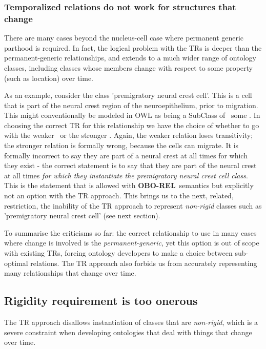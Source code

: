 \documentclass{bioinfo}
\def\partOf{\pr{part\_of}}
\def\atAllTimes{\pr{at-all-times}}
\def\atSomeTimes{\pr{at-some-times}}
\def\OBOREL{\textbf{OBO-REL}}
\begin{document}
\subsubsection{Temporalized relations do not work for structures that
  change}

There are many cases beyond the nucleus-cell case where permanent
generic parthood is required. In fact, the logical problem with the
TRs is deeper than the permanent-generic relationships, and extends to
a much wider range of ontology classes, including classes whose
members change with respect to some property (such as location) over
time.

As an example, consider the class 'premigratory neural crest
cell'. This is a cell that is part of the neural crest region of the
neuroepithelium, prior to migration. This might conventionally be
modeled in OWL as being a SubClass of \partOf\ some . In choosing the correct TR for this relationship we have the
choice of whether to go with the weaker \atSomeTimes\ or the stronger
\atAllTimes. Again, the weaker relation loses transitivity; the
stronger relation is formally wrong, because the cells can migrate. It
is formally incorrect to say they are part of a neural crest at all
times for which they exist - the correct statement is to say that they
are part of the neural crest at all times \emph{for which they
  instantiate the premigratory neural crest cell class}. This is the
statement that is allowed with \OBOREL\ semantics but explicitly not
an option with the TR approach. This brings us to the next, related,
restriction, the inability of the TR approach to represent
\emph{non-rigid} classes such as 'premigratory neural crest cell' (see
next section).

To summarise the criticisms so far: the correct relationship to use in
many cases where change is involved is the \emph{permanent-generic},
yet this option is out of scope with existing TRs, forcing ontology
developers to make a choice between sub-optimal relations. The TR
approach also forbids us from accurately representing many
relationships that change over time.

\subsection{Rigidity requirement is too onerous}

The TR approach disallows instantiation of classes that are
\emph{non-rigid}, which is a severe constraint when developing
ontologies that deal with things that change over time.
\end{document}
